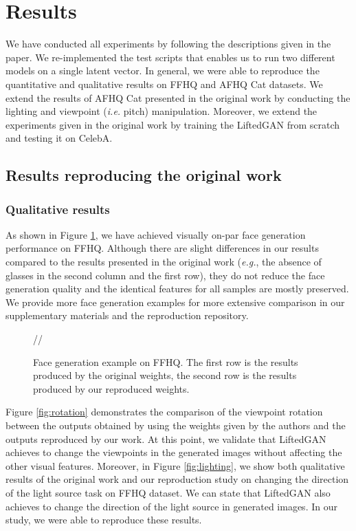 \section{Results}
\label{sec:results}

We have conducted all experiments by following the descriptions given in the paper. We re-implemented the test scripts that enables us to run two different models on a single latent vector. In general, we were able to reproduce the quantitative and qualitative results on FFHQ and AFHQ Cat datasets. We extend the results of AFHQ Cat presented in the original work by conducting the lighting and viewpoint (\textit{i.e.} pitch) manipulation. Moreover, we extend the experiments given in the original work by training the LiftedGAN from scratch and testing it on CelebA.


\subsection{Results reproducing the original work}
\subsubsection{Qualitative results}

As shown in Figure \ref{fig:original_vs_re_faces}, we have achieved visually on-par face generation performance on FFHQ. Although there are slight differences in our results compared to the results presented in the original work (\textit{e.g.}, the absence of glasses in the second column and the first row), they do not reduce the face generation quality and the identical features for all samples are mostly preserved. We provide more face generation examples for more extensive comparison in our supplementary materials and the reproduction repository.

\begin{figure}[t!]
    \centering
     //
    \caption{Face generation example on FFHQ. The first row is the results produced by the original weights, the second row is the results produced by our reproduced weights.}
    \label{fig:original_vs_re_faces}
\end{figure}

Figure \ref{fig:rotation} demonstrates the comparison of the viewpoint rotation between the outputs obtained by using the weights given by the authors and the outputs reproduced by our work. At this point, we validate that LiftedGAN achieves to change the viewpoints in the generated images without affecting the other visual features. Moreover, in Figure \ref{fig:lighting}, we show both qualitative results of the original work and our reproduction study on changing the direction of the light source task on FFHQ dataset. We can state that LiftedGAN also achieves to change the direction of the light source in generated images. In our study, we were able to reproduce these results.

